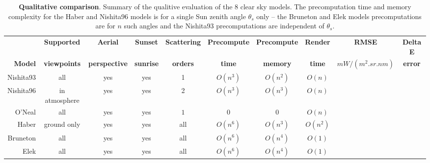 \begin{table*}[ht!]
\renewcommand{\arraystretch}{1.3}
\caption{{\bf Qualitative comparison}. Summary of the qualitive evaluation of
the 8 clear sky models. The precomputation time and memory complexity for the
Haber and Nishita96 models is for a single Sun zenith angle $\theta_s$ only --
the Bruneton and Elek models precomputations are for $n$ such angles and the
Nishita93 precomputations are independent of $\theta_s$.}
\label{fig:qualitative_comparison}
\centering
\begin{tabular}{|r||c|c|c|c|c|c|c|c|c|}
\hline
\bfseries & \bfseries Supported & \bfseries Aerial & \bfseries Sunset &
\bfseries Scattering & \bfseries Precompute & \bfseries Precompute &
\bfseries Render & \bfseries RMSE & \bfseries Delta E \\
\bfseries Model & \bfseries viewpoints & \bfseries perspective & \bfseries
sunrise & \bfseries orders & \bfseries time & \bfseries memory & \bfseries time
& \bfseries $mW/(m^2.sr.nm)$ & \bfseries error \\
\hline
Nishita93 & all & yes & yes & 1 & $O(n^3)$ & $O(n^2)$ & $O(n)$ &
 &
 \\
\hline
Nishita96 & in atmosphere & yes & yes & 2 & $O(n^3)$ & $O(n^3)$ & $O(n)$ &
 &
 \\
\hline
O'Neal & all & yes & yes & $1$ & $0$ & $0$ & $O(n)$ &
 &
 \\
\hline
Haber & ground only & yes & yes & all & $O(n^6)$ & $O(n^3)$ & $O(n^2)$ &
 &
 \\
\hline
Bruneton & all & yes & yes & all & $O(n^6)$ & $O(n^4)$ & $O(1)$ &
 &
 \\
\hline
Elek & all & yes & yes & all & $O(n^6)$ & $O(n^4)$ & $O(1)$ &
 &
 \\

\end{tabular}
\end{table*}
